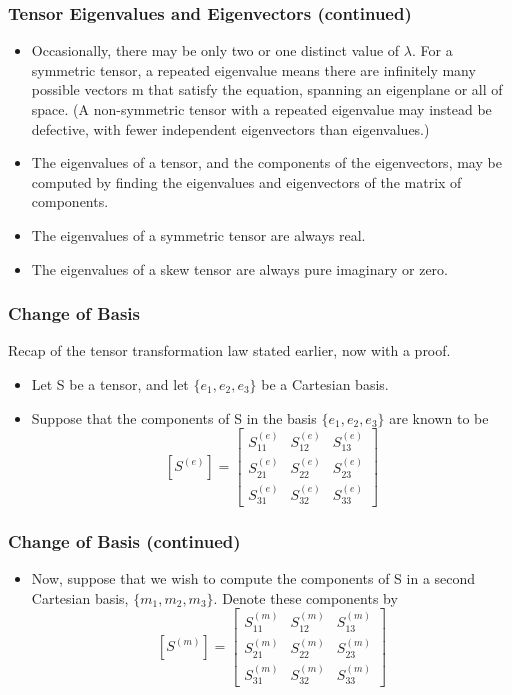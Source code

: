\documentclass[aspectratio=169,11pt]{beamer}
\begin{document}
\begin{frame}
\frametitle{Tensor Eigenvalues and Eigenvectors (continued)}
\begin{itemize}
    \item Occasionally, there may be only two or one distinct value of \(\lambda\). For a symmetric tensor, a repeated eigenvalue means there are infinitely many possible vectors m that satisfy the equation, spanning an eigenplane or all of space. (A non-symmetric tensor with a repeated eigenvalue may instead be defective, with fewer independent eigenvectors than eigenvalues.)
    \item The eigenvalues of a tensor, and the components of the eigenvectors, may be computed by finding the eigenvalues and eigenvectors of the matrix of components.
    \item The eigenvalues of a symmetric tensor are always real.
    \item The eigenvalues of a skew tensor are always pure imaginary or zero.
\end{itemize}
\end{frame}

\begin{frame}
\frametitle{Change of Basis}
{\footnotesize\color{DarkGray}Recap of the tensor transformation law stated earlier, now with a proof.\par}
\begin{itemize}
    \item Let S be a tensor, and let \(\{e_1, e_2, e_3\}\) be a Cartesian basis.
    \item Suppose that the components of S in the basis \(\{e_1, e_2, e_3\}\) are known to be
    \[
    [S^{(e)}] =
    \begin{bmatrix}
        S_{11}^{(e)} & S_{12}^{(e)} & S_{13}^{(e)} \\
        S_{21}^{(e)} & S_{22}^{(e)} & S_{23}^{(e)} \\
        S_{31}^{(e)} & S_{32}^{(e)} & S_{33}^{(e)}
    \end{bmatrix}
    \]
\end{itemize}
\end{frame}

\begin{frame}
\frametitle{Change of Basis (continued)}
\begin{itemize}
    \item Now, suppose that we wish to compute the components of S in a second Cartesian basis, \(\{m_1, m_2, m_3\}\). Denote these components by
    \[
    [S^{(m)}] =
    \begin{bmatrix}
        S_{11}^{(m)} & S_{12}^{(m)} & S_{13}^{(m)} \\
        S_{21}^{(m)} & S_{22}^{(m)} & S_{23}^{(m)} \\
        S_{31}^{(m)} & S_{32}^{(m)} & S_{33}^{(m)}
    \end{bmatrix}
    \]
\end{itemize}
\end{frame}
\end{document}
